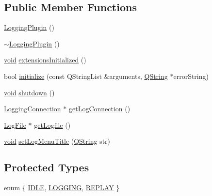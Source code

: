 \subsection*{Public Member Functions}
\begin{DoxyCompactItemize}
\item 
\hyperlink{group___logging_gaddeb416da42e01f34abe18fa2fa39400}{Logging\-Plugin} ()
\item 
\hyperlink{group___logging_gaea5e4f27d801294d19b75975ce35a567}{$\sim$\-Logging\-Plugin} ()
\item 
\hyperlink{group___u_a_v_objects_plugin_ga444cf2ff3f0ecbe028adce838d373f5c}{void} \hyperlink{group___logging_gafefd3e10b5da148d3f936cc3631e4792}{extensions\-Initialized} ()
\item 
bool \hyperlink{group___logging_ga35b6ec31ee1c4118f1b15d8fb425e013}{initialize} (const Q\-String\-List \&arguments, \hyperlink{group___u_a_v_objects_plugin_gab9d252f49c333c94a72f97ce3105a32d}{Q\-String} $\ast$error\-String)
\item 
\hyperlink{group___u_a_v_objects_plugin_ga444cf2ff3f0ecbe028adce838d373f5c}{void} \hyperlink{group___logging_ga15f368e20b8953eb38b932e59462c779}{shutdown} ()
\item 
\hyperlink{class_logging_connection}{Logging\-Connection} $\ast$ \hyperlink{class_logging_plugin_a50a824fc8b3afb92e4022c61c8ed0eff}{get\-Log\-Connection} ()
\item 
\hyperlink{class_log_file}{Log\-File} $\ast$ \hyperlink{class_logging_plugin_af36b137218e9bcf44a1c79d954a8f0b2}{get\-Logfile} ()
\item 
\hyperlink{group___u_a_v_objects_plugin_ga444cf2ff3f0ecbe028adce838d373f5c}{void} \hyperlink{class_logging_plugin_a732485aa196fa951f26f38764111938a}{set\-Log\-Menu\-Title} (\hyperlink{group___u_a_v_objects_plugin_gab9d252f49c333c94a72f97ce3105a32d}{Q\-String} str)
\end{DoxyCompactItemize}
\subsection*{Protected Types}
\begin{DoxyCompactItemize}
\item 
enum \{ \hyperlink{class_logging_plugin_adbbefe49ca5ce8b4857276187959fca8ab016e5df51d783046bf9e64102b4c54c}{I\-D\-L\-E}, 
\hyperlink{class_logging_plugin_adbbefe49ca5ce8b4857276187959fca8a8e92421dfc070a67508f0311f921c0cd}{L\-O\-G\-G\-I\-N\-G}, 
\hyperlink{class_logging_plugin_adbbefe49ca5ce8b4857276187959fca8aa2f7f75dc98e5eda7bd7dbd4bf83a31b}{R\-E\-P\-L\-A\-Y}
 \}
\end{DoxyCompactItemize}
